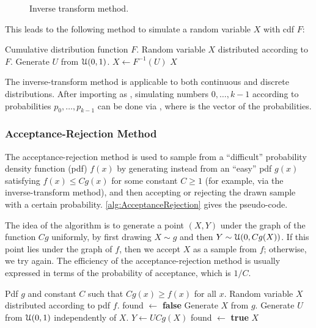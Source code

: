 \begin{figure}[H]
	\centering
	
	\caption{Inverse transform method.}\label{fig:inverseTransformMethod}
\end{figure}

This leads to the following method to simulate a random variable \(X\) with cdf \(F\):

\begin{algorithm}[H]
	\caption{Inverse-Transform Method}
	\begin{algorithmic}[1]
		\Require{} Cumulative distribution function \(F\).
		\Ensure{} Random variable \(X\) distributed according to \(F\).
		\State{} Generate \(U\) from \(\EuScript{U}(0, 1)\).
		\State{} \(X \gets F^{-1}(U)\)
		\State{} \Return{} \(X\)
	\end{algorithmic}
\end{algorithm}

\begin{xtip}
	The inverse-transform method is applicable to both continuous and discrete distributions. After importing  as , simulating numbers \(0, \dots, k - 1\) according to probabilities \(p_0, \dots, p_{k-1}\) can be done via , where  is the vector of the probabilities.
\end{xtip}

\subsubsection{Acceptance-Rejection Method}
The acceptance-rejection method is used to sample from a ``difficult'' probability density function (pdf) \(f(x)\) by generating instead from an ``easy'' pdf \(g(x)\) satisfying \(f(x) \le C g(x)\) for some constant \(C \ge 1\) (for example, via the inverse-transform method), and then accepting or rejecting the drawn sample with a certain probability. \cref{alg:AcceptanceRejection} gives the pseudo-code.

The idea of the algorithm is to generate a point \((X, Y)\) under the graph of the function \(Cg\) uniformly, by first drawing \(X \sim g\) and then \(Y \sim \EuScript{U}(0, Cg(X))\). If this point lies under the graph of \(f\), then we accept \(X\) as a sample from \(f\); otherwise, we try again. The efficiency of the acceptance-rejection method is usually expressed in terms of the probability of acceptance, which is \(1/C\).

\begin{algorithm}[H]
	\caption{Acceptance-Rejection Method}\label{alg:AcceptanceRejection}
	\begin{algorithmic}[1]
		\Require{} Pdf \(g\) and constant \(C\) such that \(Cg(x) \ge f(x)\) for all \(x\).
		\Ensure{} Random variable \(X\) distributed according to pdf \(f\).
		\State{} found \(\gets\) \textbf{false}
		\State{} Generate \(X\) from \(g\).
		\State{} Generate \(U\) from \(\EuScript{U}(0, 1)\) independently of \(X\).
		\State{} \(Y \gets U C g(X)\)
		\State{} found \(\gets\) \textbf{true}
		\EndIf
		\EndWhile
		\State{} \Return{} \(X\)
	\end{algorithmic}
\end{algorithm}


